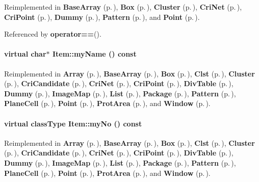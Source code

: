 Reimplemented in {\bf Base\-Array} {\rm (p.\,\pageref{BaseArray_a12})}, {\bf Box} {\rm (p.\,\pageref{Box_a6})}, {\bf Cluster} {\rm (p.\,\pageref{Cluster_a5})}, {\bf Cri\-Net} {\rm (p.\,\pageref{CriNet_a5})}, {\bf Cri\-Point} {\rm (p.\,\pageref{CriPoint_a6})}, {\bf Dummy} {\rm (p.\,\pageref{Dummy_a4})}, {\bf Pattern} {\rm (p.\,\pageref{Pattern_a4})}, and {\bf Point} {\rm (p.\,\pageref{Point_a7})}.

Referenced by {\bf operator==}().\label{Item_a4}
\paragraph{\setlength{\rightskip}{0pt plus 5cm}virtual char$\ast$ Item::my\-Name () const\hspace{0.3cm}{\tt  [pure virtual]}}\hfill



Reimplemented in {\bf Array} {\rm (p.\,\pageref{Array_a6})}, {\bf Base\-Array} {\rm (p.\,\pageref{BaseArray_a11})}, {\bf Box} {\rm (p.\,\pageref{Box_a5})}, {\bf Clst} {\rm (p.\,\pageref{Clst_a4})}, {\bf Cluster} {\rm (p.\,\pageref{Cluster_a4})}, {\bf Cri\-Candidate} {\rm (p.\,\pageref{CriCandidate_a3})}, {\bf Cri\-Net} {\rm (p.\,\pageref{CriNet_a3})}, {\bf Cri\-Point} {\rm (p.\,\pageref{CriPoint_a4})}, {\bf Div\-Table} {\rm (p.\,\pageref{DivTable_a3})}, {\bf Dummy} {\rm (p.\,\pageref{Dummy_a3})}, {\bf Image\-Map} {\rm (p.\,\pageref{ImageMap_a3})}, {\bf List} {\rm (p.\,\pageref{List_a7})}, {\bf Package} {\rm (p.\,\pageref{Package_a9})}, {\bf Pattern} {\rm (p.\,\pageref{Pattern_a3})}, {\bf Plane\-Cell} {\rm (p.\,\pageref{PlaneCell_a3})}, {\bf Point} {\rm (p.\,\pageref{Point_a5})}, {\bf Prot\-Area} {\rm (p.\,\pageref{ProtArea_a3})}, and {\bf Window} {\rm (p.\,\pageref{Window_a3})}.\label{Item_a3}
\paragraph{\setlength{\rightskip}{0pt plus 5cm}virtual {\bf class\-Type} Item::my\-No () const\hspace{0.3cm}{\tt  [pure virtual]}}\hfill



Reimplemented in {\bf Array} {\rm (p.\,\pageref{Array_a5})}, {\bf Base\-Array} {\rm (p.\,\pageref{BaseArray_a10})}, {\bf Box} {\rm (p.\,\pageref{Box_a4})}, {\bf Clst} {\rm (p.\,\pageref{Clst_a3})}, {\bf Cluster} {\rm (p.\,\pageref{Cluster_a3})}, {\bf Cri\-Candidate} {\rm (p.\,\pageref{CriCandidate_a2})}, {\bf Cri\-Net} {\rm (p.\,\pageref{CriNet_a2})}, {\bf Cri\-Point} {\rm (p.\,\pageref{CriPoint_a3})}, {\bf Div\-Table} {\rm (p.\,\pageref{DivTable_a2})}, {\bf Dummy} {\rm (p.\,\pageref{Dummy_a2})}, {\bf Image\-Map} {\rm (p.\,\pageref{ImageMap_a2})}, {\bf List} {\rm (p.\,\pageref{List_a6})}, {\bf Package} {\rm (p.\,\pageref{Package_a8})}, {\bf Pattern} {\rm (p.\,\pageref{Pattern_a2})}, {\bf Plane\-Cell} {\rm (p.\,\pageref{PlaneCell_a2})}, {\bf Point} {\rm (p.\,\pageref{Point_a4})}, {\bf Prot\-Area} {\rm (p.\,\pageref{ProtArea_a2})}, and {\bf Window} {\rm (p.\,\pageref{Window_a2})}.

